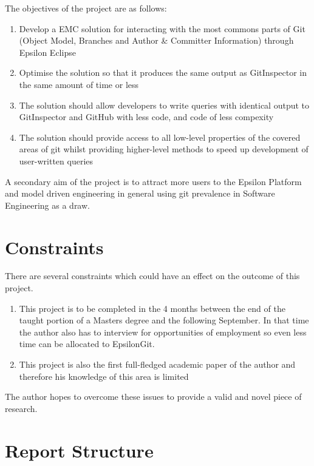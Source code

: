 \documentclass[11pt]{book}
\begin{document}
The objectives of the project are as follows:

\begin{enumerate}
	\item Develop a EMC solution for interacting with the most commons parts of Git (Object Model, Branches and Author \& Committer Information) through Epsilon Eclipse
	\item Optimise the solution so that it produces the same output as GitInspector in the same amount of time or less 
	\item The solution should allow developers to write queries with identical output to GitInspector and GitHub with less code, and code of less compexity
	\item The solution should provide access to all low-level properties of the covered areas of git whilst providing higher-level methods to speed up development of user-written queries
\end{enumerate}

A secondary aim of the project is to attract more users to the Epsilon Platform and model driven engineering in general using git prevalence in Software Engineering as a draw.

\section{Constraints}
There are several constraints which could have an effect on the outcome of this project. 

\begin{enumerate}
	\item This project is to be completed in the 4 months between the end of the taught portion of a Masters degree and the following September. In that time the author also has to interview for opportunities of employment so even less time can be allocated to EpsilonGit.
	\item This project is also the first full-fledged academic paper of the author and therefore his knowledge of this area is limited
\end{enumerate}

The author hopes to overcome these issues to provide a valid and novel piece of research.

\section{Report Structure}
\end{document}
